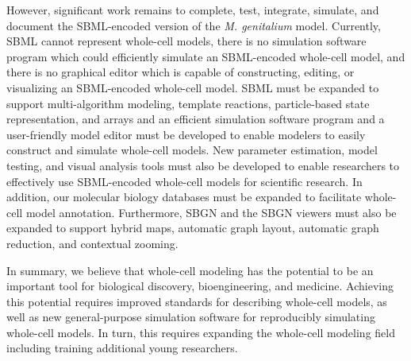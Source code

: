 \documentclass[journal,transmag]{IEEEtran}
\begin{document}
However, significant work remains to complete, test, integrate, simulate, and document the SBML-encoded version of the \textit{M. genitalium} model. Currently, SBML cannot represent whole-cell models, there is no simulation software program which could efficiently simulate an SBML-encoded whole-cell model, and there is no graphical editor which is capable of constructing, editing, or visualizing an SBML-encoded whole-cell model. SBML must be expanded to support multi-algorithm modeling, template reactions, particle-based state representation, and arrays and an efficient simulation software program and a user-friendly model editor must be developed to enable modelers to easily construct and simulate whole-cell models. New parameter estimation, model testing, and visual analysis tools must also be developed to enable researchers to effectively use SBML-encoded whole-cell models for scientific research. In addition, our molecular biology databases must be expanded to facilitate whole-cell model annotation. Furthermore, SBGN and the SBGN viewers must also be expanded to support hybrid maps, automatic graph layout, automatic graph reduction, and contextual zooming.

In summary, we believe that whole-cell modeling has the potential to be an important tool for biological discovery, bioengineering, and medicine. Achieving this potential requires improved standards for describing whole-cell models, as well as new general-purpose simulation software for reproducibly simulating whole-cell models. In turn, this requires expanding the whole-cell modeling field including training additional young researchers.

\ifCLASSOPTIONcaptionsoff
  \newpage
\fi




% 
\end{document}
